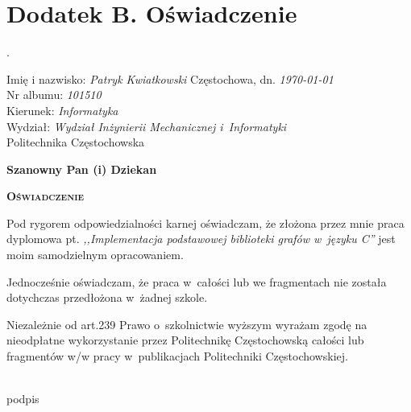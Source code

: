 \documentclass[a4paper,12pt,polish,oneside,openright]{thesis}
\begin{document}
\chapter*{Dodatek B. Oświadczenie}
\newlength{\oldparskip}
\setlength{\oldparskip}{\parskip}
\setlength{\parindent}{0pt}.
\setlength{\parskip}{0.3cm}

Imię i nazwisko: \emph{Patryk Kwiatkowski} \hfill Częstochowa, dn. \emph{\today} \\
Nr albumu: \emph{101510} \\
Kierunek: \emph{Informatyka} \\
Wydział: \emph{Wydział Inżynierii Mechanicznej i~Informatyki} \\

\vfill
Politechnika Częstochowska
\vfill
\begin{flushright}
\textbf{Szanowny Pan (i) Dziekan} \hspace*{1cm}
\end{flushright}
\vfill
\begin{center}
\textbf{\textsc{\large Oświadczenie}}
\end{center}
\vfill

Pod rygorem odpowiedzialności karnej oświadczam, że złożona przez mnie praca dyplomowa pt. \emph{,,Implementacja podstawowej biblioteki grafów w~języku C''} jest moim samodzielnym opracowaniem.

Jednocześnie oświadczam, że praca w~całości lub we fragmentach nie została dotychczas przedłożona w~żadnej szkole.

Niezależnie od art.239 Prawo o~szkolnictwie wyższym wyrażam zgodę na nieodpłatne wykorzystanie przez Politechnikę Częstochowską całości lub fragmentów w/w pracy w~publikacjach Politechniki Częstochowskiej.

\vfill

\begin{center}
	\begin{minipage}{0.7\textwidth}
		\begin{flushright}
		\begin{minipage}{0.4\textwidth}
			\begin{center}
			\dotfill\\
			podpis
			\end{center}
		\end{minipage}
		\end{flushright}
	\end{minipage}
\end{center}
\end{document}
